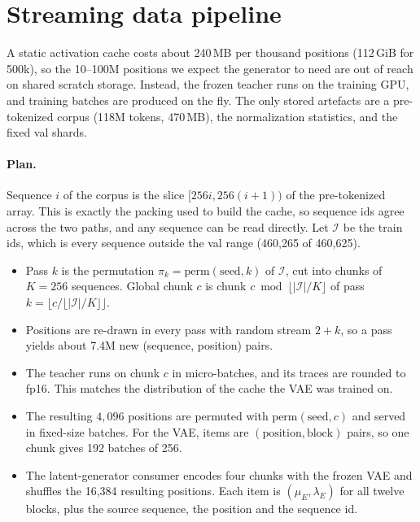 \documentclass[11pt]{article}
\begin{document}
\section{Streaming data pipeline}
\label{sec:stream}

A static activation cache costs about 240\,MB per thousand positions (112\,GiB for 500k), so the 10--100M positions we
expect the generator to need are out of reach on shared scratch storage. Instead, the frozen teacher runs on the training
GPU, and training batches are produced on the fly. The only stored artefacts are a pre-tokenized corpus (118M tokens, 470\,MB),
the normalization statistics, and the fixed val shards.

\paragraph{Plan.} Sequence $i$ of the corpus is the slice $[256i, 256(i+1))$ of the pre-tokenized array. This is exactly
the packing used to build the cache, so sequence ids agree across the two paths, and any sequence can be read directly.
Let $\mathcal{I}$ be the train ids, which is every sequence outside the val range (460{,}265 of 460{,}625).
\begin{itemize}[leftmargin=1.5em]
  \item Pass $k$ is the permutation $\pi_k = \mathrm{perm}(\text{seed}, k)$ of $\mathcal{I}$, cut into chunks of $K = 256$
    sequences. Global chunk $c$ is chunk $c \bmod \lfloor|\mathcal{I}|/K\rfloor$ of pass $k = \lfloor c / \lfloor|\mathcal{I}|/K\rfloor\rfloor$.
  \item Positions are re-drawn in every pass with random stream $2 + k$, so a pass yields about 7.4M new (sequence, position)
    pairs.
  \item The teacher runs on chunk $c$ in micro-batches, and its traces are rounded to fp16. This matches the distribution of
    the cache the VAE was trained on.
  \item The resulting $4{,}096$ positions are permuted with $\mathrm{perm}(\text{seed}, c)$ and served in fixed-size batches.
    For the VAE, items are $(\text{position}, \text{block})$ pairs, so one chunk gives 192 batches of 256.
  \item The latent-generator consumer encodes four chunks with the frozen VAE and shuffles the 16{,}384 resulting
    positions. Each item is $(\mu_E, \lambda_E)$ for all twelve blocks, plus the source sequence, the position and the
    sequence id.
\end{itemize}
\end{document}
